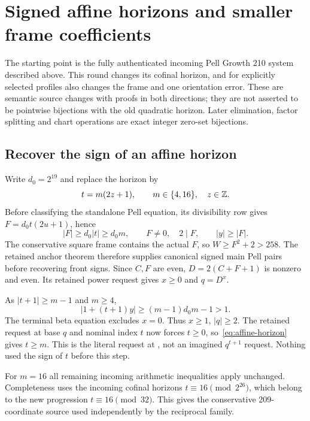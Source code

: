 \section{Signed affine horizons and smaller frame coefficients}
\label{sec:quartic23}
The starting point is the fully authenticated incoming Pell Growth 210
system described above. This round changes its cofinal horizon, and for
explicitly selected profiles also changes the frame and one orientation
error. These are semantic source changes with proofs in both directions;
they are not asserted to be pointwise bijections with the old quadratic
horizon. Later elimination, factor splitting and chart operations are exact
integer zero-set bijections.

\subsection{Recover the sign of an affine horizon}
Write $d_0=2^{19}$ and replace the horizon by
\begin{equation}\label{eq:affine-horizon}
 t=m(2z+1),\qquad m\in\{4,16\},\quad z\in\mathbb Z.
\end{equation}
Before classifying the standalone Pell equation, its divisibility row gives
$F=d_0t(2u+1)$, hence
\[
 |F|\ge d_0|t|\ge d_0m,
 \qquad F\ne0,\quad2\mid F,
 \qquad |y|\ge|F|.
\]
The conservative square frame contains the actual $F$, so
$W\ge F^2+2>258$. The retained anchor theorem therefore supplies canonical
signed main Pell pairs before recovering front signs. Since $C,F$ are even,
$D=2(C+F+1)$ is nonzero and even. Its retained power request gives
$x\ge0$ and $q=D^x$.

As $|t+1|\ge m-1$ and $m\ge4$,
\[
 |1+(t+1)y|\ge(m-1)d_0m-1>1.
\]
The terminal beta equation excludes $x=0$. Thus $x\ge1$, $|q|\ge2$.
The retained request at base $q$ and nominal index $t$ now forces $t\ge0$,
so~\eqref{eq:affine-horizon} gives $t\ge m$. This is the literal
 request at , not an imagined $q^{t+1}$
request. Nothing used the sign of $t$ before this step.

For $m=16$ all remaining incoming arithmetic inequalities apply unchanged.
Completeness uses the incoming cofinal horizons $t\equiv16\pmod{2^{26}}$,
which belong to the new progression $t\equiv16\pmod{32}$. This gives the
conservative 209-coordinate source used independently by the reciprocal
family.

